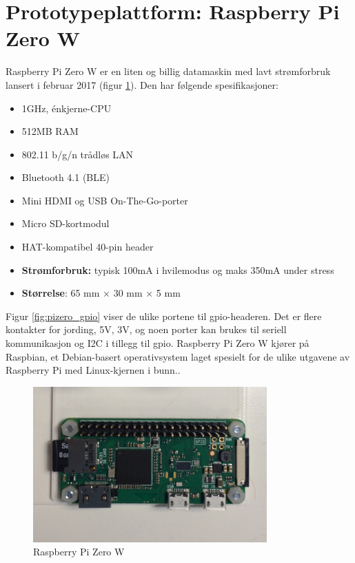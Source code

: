 \section{Prototypeplattform: Raspberry Pi Zero W}
Raspberry Pi Zero W er en liten og billig datamaskin med lavt strømforbruk lansert i februar 2017 (figur \ref{fig:pizero}).
Den har følgende spesifikasjoner: %
\begin{itemize}
    \item 1GHz, énkjerne-CPU
    \item 512MB RAM
    \item 802.11 b/g/n trådløs LAN
    \item Bluetooth 4.1 (BLE)
    \item Mini HDMI og USB On-The-Go-porter
    \item Micro SD-kortmodul
    \item HAT-kompatibel 40-pin header
    \item \textbf{Strømforbruk:} typisk 100mA i hvilemodus og maks 350mA under stress
    \item \textbf{Størrelse}: 65 mm × 30 mm × 5 mm
\end{itemize}

Figur \ref{fig:pizero_gpio} viser de ulike portene til \gls{gpio}-headeren. Det er flere kontakter for
jording, 5V, 3V, og noen porter kan brukes til seriell kommunikasjon og I2C i tillegg til \gls{gpio}.
Raspberry Pi Zero W kjører på Raspbian, et Debian-basert operativsystem laget spesielt for de ulike utgavene av
Raspberry Pi med Linux-kjernen i bunn..

\begin{figure}
\includegraphics[width=0.8\textwidth,center]{fig/prototype/pi}
\caption{Raspberry Pi Zero W}
\label{fig:pizero}
\end{figure}

